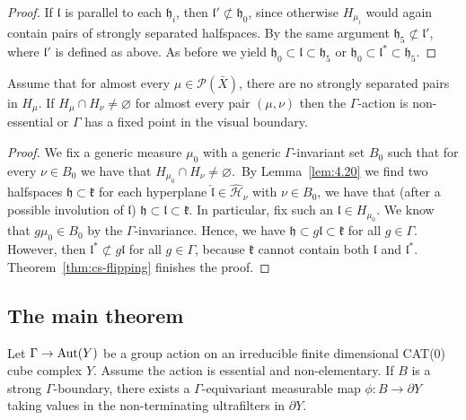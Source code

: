\begin{proof}
  If \(\mathfrak{l}\) is parallel to each \(\mathfrak{h}_i\), then \(\mathfrak{l}' \not\subset \mathfrak{h_0}\), since otherwise \(H_{\mu_i}\) would again contain pairs of strongly separated halfspaces. By the same argument \(\mathfrak{h}_5 \not\subset \mathfrak{l}'\), where \(\mathfrak{l}'\) is defined as above. As before we yield \(\mathfrak{h}_0 \subset \mathfrak{l} \subset \mathfrak{h}_5\) or \(\mathfrak{h}_0 \subset \mathfrak{l}^\ast \subset \mathfrak{h}_5\).
\end{proof}

\begin{cor}[{\cite[Corollary~4.21]{MR3509968}}]
  \label{cor:4.21}
  Assume that for almost every \(\mu \in \mathcal{P}(\bar X)\), there are no strongly separated pairs in \(H_\mu\). If \(H_\mu \cap H_\nu \neq \varnothing\) for almost every pair \((\mu, \nu)\) then the \(\Gamma\)-action is non-essential or \(\Gamma\) has a fixed point in the visual boundary.
\end{cor}

\begin{proof}
  We fix a generic measure \(\mu_0\) with a generic \(\Gamma\)-invariant set \(B_0\) such that for every \(\nu \in B_0\) we have that \(H_{\mu_0} \cap H_\nu \neq \varnothing\).\ By Lemma~\ref{lem:4.20} we find two halfspaces \(\mathfrak{h} \subset \mathfrak{k}\) for each hyperplane \(\mathfrak{\hat l} \in \mathcal{\hat H}_\nu\) with \(\nu \in B_0\), we have that (after a possible involution of \(\mathfrak{l}\)) \(\mathfrak{h} \subset \mathfrak{l} \subset \mathfrak{k}\). In particular, fix such an \(\mathfrak{l} \in H_{\mu_0}\). We know that \(g\mu_0 \in B_0\) by the \(\Gamma\)-invariance. Hence, we have \(\mathfrak{h} \subset g\mathfrak{l} \subset \mathfrak{k}\) for all \(g \in \Gamma\). However, then \(\mathfrak{l}^\ast \not \subset g\mathfrak{l}\) for all \(g \in \Gamma\), because \(\mathfrak{k}\) cannot contain both \(\mathfrak{l}\) and \(\mathfrak{l}^\ast\). Theorem~\ref{thm:cs-flipping} finishes the proof.
\end{proof}

\subsection{The main theorem}
\label{sec:main-proof}

\begin{thm}[{\cite[Theorem~4.1]{MR3509968}}]
  \label{thm:4.1}
  Let \(\Gamma \to \operatorname{Aut}(Y)\) be a group action on an irreducible finite dimensional CAT(0) cube complex \(Y\). Assume the action is essential and non-elementary. If \(B\) is a strong \(\Gamma\)-boundary, there exists a \(\Gamma\)-equivariant measurable map \(\phi\colon B \to \partial Y\) taking values in the non-terminating ultrafilters in \(\partial Y\).
\end{thm}

